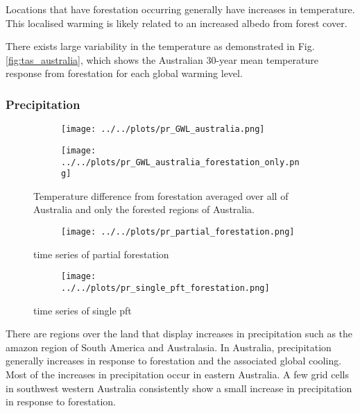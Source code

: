 \documentclass[]{article}
\begin{document}
Locations that have forestation occurring generally have increases in temperature.
This localised warming is likely related to an increased albedo from forest cover.

There exists large variability in the temperature as demonstrated in Fig. \ref{fig:tas_australia}, which shows the Australian 30-year mean temperature response from forestation for each global warming level.

\subsubsection{Precipitation}

\begin{figure}[H]
    \centering
    \begin{subfigure}[b]{0.4\linewidth}
        \texttt{[image: ../../plots/pr\_GWL\_australia.png]}
    \end{subfigure}
    \begin{subfigure}[b]{0.4\linewidth}
        \texttt{[image: ../../plots/pr\_GWL\_australia\_forestation\_only.png]}
    \end{subfigure}
    \caption{Temperature difference from forestation averaged over all of Australia and only the forested regions of Australia.}
    \label{fig:pr_australia_timeseries}
\end{figure}

\begin{figure}[H]
    \centering
    \begin{subfigure}[b]{\linewidth}
        \texttt{[image: ../../plots/pr\_partial\_forestation.png]}
    \end{subfigure}
    \caption{time series of partial forestation}
    \label{fig:pr_australia_partial}
\end{figure}

\begin{figure}[H]
    \centering
    \begin{subfigure}[b]{\linewidth}
        \texttt{[image: ../../plots/pr\_single\_pft\_forestation.png]}
    \end{subfigure}
    \caption{time series of single pft}
    \label{fig:pr_australia_single}
\end{figure}

There are regions over the land that display increases in precipitation such as the amazon region of South America and Australasia.
In Australia, precipitation generally increases in response to forestation and the associated global cooling.
Most of the increases in precipitation occur in eastern Australia.
A few grid cells in southwest western Australia consistently show a small increase in precipitation in response to forestation.
\end{document}
